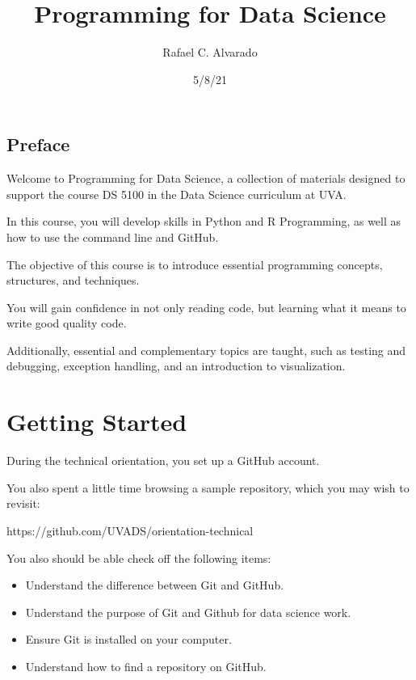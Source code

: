 \documentclass[
  letterpaper,
  DIV=11,
  numbers=noendperiod]{scrreport}
\title{Programming for Data Science}
\author{Rafael C. Alvarado}
\date{5/8/21}
\providecommand{\tightlist}{%
  \setlength{\itemsep}{0pt}\setlength{\parskip}{0pt}}\usepackage{longtable,booktabs,array}
\renewcommand*\contentsname{Table of contents}
\newcommand\contentsname{Table of contents}
\begin{document}
\maketitle
\ifdefined\Shaded\renewenvironment{Shaded}{\begin{tcolorbox}[frame hidden, sharp corners, boxrule=0pt, borderline west={3pt}{0pt}{shadecolor}, breakable, interior hidden, enhanced]}{\end{tcolorbox}}\fi

\renewcommand*\contentsname{Table of contents}
{
\hypersetup{linkcolor=}
\setcounter{tocdepth}{2}
\tableofcontents
}

\hypertarget{preface}{%
\chapter{Preface}\label{preface}}

Welcome to Programming for Data Science, a collection of materials
designed to support the course DS 5100 in the Data Science curriculum at
UVA.

In this course, you will develop skills in Python and R Programming, as
well as how to use the command line and GitHub.

The objective of this course is to introduce essential programming
concepts, structures, and techniques.

You will gain confidence in not only reading code, but learning what it
means to write good quality code.

Additionally, essential and complementary topics are taught, such as
testing and debugging, exception handling, and an introduction to
visualization.

\part{Getting Started}

During the technical orientation, you set up a GitHub account.

You also spent a little time browsing a sample repository, which you may
wish to revisit:

https://github.com/UVADS/orientation-technical

You also should be able check off the following items:

\begin{itemize}
\tightlist
\item
  Understand the difference between Git and GitHub.
\item
  Understand the purpose of Git and Github for data science work.
\item
  Ensure Git is installed on your computer.
\item
  Understand how to find a repository on GitHub.
\end{itemize}
\end{document}
